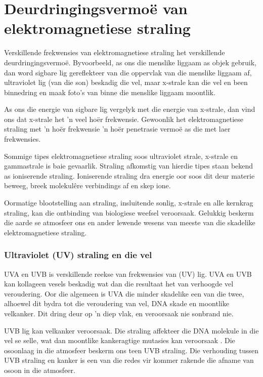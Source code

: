 \section{Deurdringingsvermo\"e van elektromagnetiese straling}
\nopagebreak
Verskillende frekwensies van e\-lek\-tro\-mag\-ne\-tie\-se straling het verskillende deurdringingsvermo\"e. Byvoorbeeld, as ons die menslike liggaam as objek gebruik, dan word sigbare lig gereflekteer van die oppervlak van die menslike liggaam af, ultraviolet lig (van die son) beskadig die vel, maar x-strale kan die vel en been binnedring en maak foto's van binne die menslike liggaam moontlik. \par 

As ons die energie van sigbare lig vergelyk met die energie van x-strale, dan vind ons dat x-strale het 'n veel ho\"er frekwensie. Gewoonlik het elektromagnetiese straling met 'n ho\"er frekwensie 'n ho\"er penetrasie vermo\"e as die met laer frekwensies. \par 

Sommige tipes elektromagnetiese straling soos ultraviolet strale, x-strale en gammastrale is baie gevaarlik. Straling afkomstig van hierdie tipes staan bekend as ioniserende straling. Ioniserende straling dra energie oor soos dit deur materie beweeg, breek molekul\^ere verbindings af en skep ione. \par 

Oormatige blootstelling aan straling, insluitende sonlig, x-strale en alle kernkrag straling, kan die ontbinding van biologiese weefsel veroorsaak. Gelukkig beskerm die aarde se atmosfeer ons en ander lewende wesens van meeste van die skadelike e\-lek\-tro\-mag\-ne\-tie\-se straling.\par 

            \subsubsection*{Ultraviolet (UV) straling en die vel}
            \nopagebreak
        \label{m38779*id189482} UVA en UVB is verskillende reekse van frekwensies van (UV) lig. UVA en UVB kan kollageen vesels beskadig wat dan die resultaat het van verhoogde vel veroudering. Oor die algemeen is UVA die minder skadelike een van die twee, alhoewel dit bydra tot die veroudering van vel, DNA skade en moontlike velkanker. Dit dring deur op 'n diep vlak, en veroorsaak nie sonbrand nie. \par 
        \label{m38779*id189490}UVB lig kan velkanker veroorsaak. Die straling affekteer die DNA molekule in die vel se selle, wat dan moontlike kankeragtige mutasies kan veroorsaak . Die osoonlaag in die atmosfeer beskerm ons teen UVB straling. Die verhouding tussen UVB straling en kanker is een van die redes vir kommer rakende die afname van osoon in die atmosfeer. \par 
        
